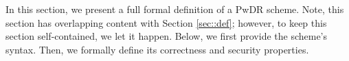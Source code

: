 %
%
%
%
%  
%  
%  
%    
%   
%
%     
%
%
%


In this section, we present a full formal definition of a  PwDR scheme.  Note,  this section  has  overlapping content with  Section \ref{sec::def}; however, to keep this section self-contained,  we let it happen. Below, we first provide the scheme's syntax.  Then, we   formally define its correctness  and security properties. 


